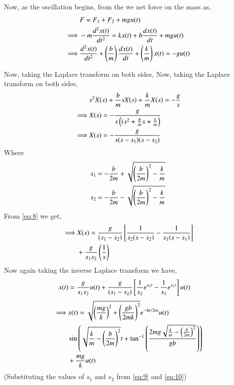 \documentclass[journal,12pt,twocolumn]{IEEEtran}
\theoremstyle{remark}
\begin{document}
\begin{enumerate}
    Now, as the oscillation begins, from the  we net force on the mass as,
    \begin{align}
        &F=F_{1}+F_{2}+mgu(t) \label{eq:3}\\
        \implies &-m\frac{d^2x(t)}{dt^2}=kx(t)+b\frac{dx(t)}{dt}+mgu(t) \label{eq:4}\\
        \implies &\frac{d^2x(t)}{dt^2}+\left(\frac{b}{m}\right)\frac{dx(t)}{dt}+\left(\frac{k}{m}\right)x(t)=-gu(t) \label{eq:5}
    \end{align}

    Now, taking the Laplace transform on both sides,
    Now, taking the Laplace transform on both sides,
    \begin{align}
        &s^2X(s)+\frac{b}{m}sX(s)+\frac{k}{m}X(s)=-\frac{g}{s} \label{eq:6}\\
        \implies &X(s)=-\frac{g}{s\left((s^2+\frac{b}{m}s+\frac{k}{m}\right)} \label{eq:7}\\
        \implies &X(s)=-\frac{g}{s(s-s_1)(s-s_2)} \label{eq:8}
    \end{align}
    Where
    \begin{align}
        &s_1=-\frac{b}{2m}+\sqrt{\left(\frac{b}{2m}\right)^2-\frac{k}{m}} \label{eq:9}\\
        &s_2=-\frac{b}{2m}-\sqrt{\left(\frac{b}{2m}\right)^2-\frac{k}{m}} \label{eq:10}
    \end{align}
    From \eqref{eq:8} we get,
    \begin{align}
        \begin{split}
            \implies &X(s)=\frac{g}{(s_1-s_2)}{}\left[\frac{1}{s_2(s-s_2)}-\frac{1}{s_1(s-s_1)}\right] \\
            &+\frac{g}{s_1s_2}\left(\frac{1}{s}\right) \label{eq:11}
        \end{split}
    \end{align}
    Now again taking the inverse Laplace transform we have,
    \begin{align}
        &x(t)=\frac{g}{s_1s_2}u(t)+\frac{g}{(s_1-s_2)}{}\left[\frac{1}{s_2}e^{s_2t}-\frac{1}{s_1}e^{s_1t}\right]u(t)\label{eq:12}
    \end{align}
    \begin{align}
    \begin{split}
    \implies &x(t) =\sqrt{\left(\frac{mg}{k}\right)^2 + \left(\frac{gb}{2mk}\right)^2}e^{-bt/2m}u(t) \\
            &\sin{\ensuremath{\left(\sqrt{\frac{k}{m} - \left(\frac{b}{2m}\right)^2}t + \tan^{-1}\left(\frac{2mg\sqrt{\frac{k}{m} - \left(\frac{b}{2m}\right)^2}}{gb}\right)\right)}} \\
            &+ \frac{mg}{k}
        u(t) \label{eq:13}
\end{split}
\end{align}
    (Substituting the values of $s_1$ and $s_2$ from \eqref{eq:9} and \eqref{eq:10})


\end{enumerate}
\end{document}
